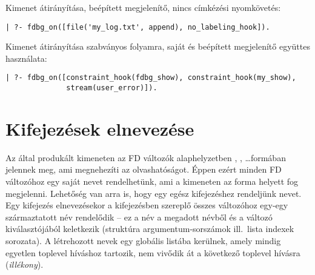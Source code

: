 Kimenet átirányítása, beépített megjelenítő, nincs címkézési nyomkövetés:

\begin{verbatim}
| ?- fdbg_on([file('my_log.txt', append), no_labeling_hook]).
\end{verbatim}

Kimenet átirányítása szabványos folyamra, saját és beépített
megjelenítő együttes használata:

\begin{verbatim}
| ?- fdbg_on([constraint_hook(fdbg_show), constraint_hook(my_show),
              stream(user_error)]).
\end{verbatim}

\section{Kifejezések elnevezése}

Az \fdbg által produkált kimeneten az FD változók alaphelyzetben ,
, \ldots formában jelennek meg, ami megnehezíti az olvashatóságot.
Éppen ezért minden FD változóhoz egy saját nevet rendelhetünk, ami a kimeneten
az  forma helyett fog megjelenni. Lehetőség van arra is,
hogy egy egész kifejezéshez rendeljünk nevet. Egy kifejezés elnevezésekor a
kifejezésben szereplő összes változóhoz egy-egy származtatott név
rendelődik -- ez a név a megadott névből és a változó kiválasztójából
keletkezik (struktúra argumentum-sorszámok ill.\ lista indexek sorozata). A
létrehozott nevek egy globális listába kerülnek, amely mindig egyetlen toplevel
híváshoz tartozik, nem vivődik át a következő toplevel hívásra (\emph{illékony}).


